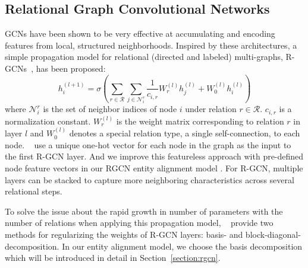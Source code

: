 	\subsection*{Relational Graph Convolutional Networks}
	\label{section:Relational Graph Convolutional Networks}
	GCNs have been shown to be very effective at accumulating and encoding features from local, structured neighborhoods. Inspired by these architectures, a simple propagation model for relational (directed and labeled) multi-graphs, R-GCNs~\cite{Schlichtkrull2017Modeling}, has been proposed:
	\begin{equation}
	h_i^{(l+1)}=\sigma (\sum_{r \in \mathcal{R}}\sum_{j \in \mathcal{N}_i^r}\frac{1}{c_{i,r}}W_r^{(l)}h_j^{(l)}+W_0^{(l)}h_i^{(l)})
	\end{equation}
	where $\mathcal{N}_i^r$ is the set of neighbor indices of node $i$ under relation $r \in \mathcal{R}$. $c_{i,r}$ is a normalization constant. $W_r^{(l)}$ is the weight matrix corresponding to relation $r$ in layer $l$ and $W_0^{(l)}$ denotes a special relation type, a single self-connection, to each node. ~\cite{Schlichtkrull2017Modeling} use a unique one-hot vector for each node in the graph as the input to the first R-GCN layer. And we improve this featureless approach with pre-defined node feature vectors in our RGCN entity alignment model .
	For R-GCN, multiple layers can be stacked to capture more neighboring characteristics across several relational steps.
	
	To solve the issue about the rapid growth in number of parameters with the number of relations when applying this propagation model, ~\cite{Schlichtkrull2017Modeling} provide two methods for regularizing the weights of R-GCN layers: basis- and block-diagonal-decomposition. In our entity alignment model, we choose the basis decomposition which will be introduced in detail in Section~\ref{section:rgcn}.

